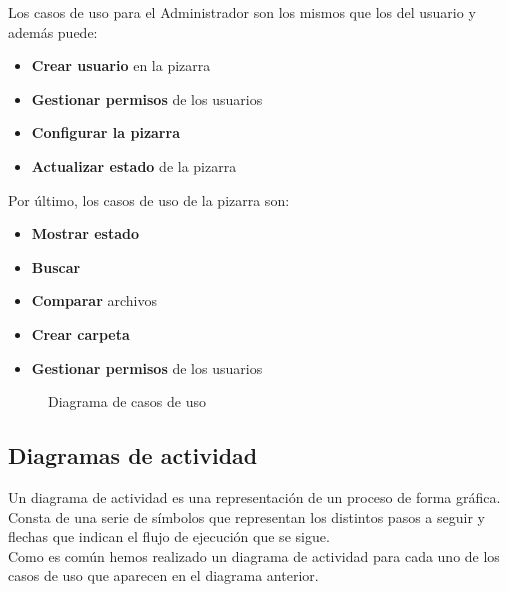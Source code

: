 Los casos de uso para el Administrador son los mismos que los del usuario y además puede:
\begin{itemize}
\item \textbf{Crear usuario} en la pizarra
\item \textbf{Gestionar permisos} de los usuarios
\item \textbf{Configurar la pizarra}
\item \textbf{Actualizar estado} de la pizarra
\end{itemize}

Por último, los casos de uso de la pizarra son:
\begin{itemize}
\item \textbf{Mostrar estado}
\item \textbf{Buscar}
\item \textbf{Comparar} archivos
\item \textbf{Crear carpeta}
\item \textbf{Gestionar permisos} de los usuarios
\end{itemize} 

\begin{landscape}
\begin{figure}[!h]
\vspace*{3cm}
\centering
\casos
\caption{Diagrama de casos de uso}
\end{figure}
\end{landscape}

\subsection{Diagramas de actividad}
Un diagrama de actividad es una representación de un proceso de forma gráfica. Consta de una serie de símbolos que representan los distintos pasos a seguir y flechas que indican el flujo de ejecución que se sigue.\\

Como es común hemos realizado un diagrama de actividad para cada uno de los casos de uso que aparecen en el diagrama anterior.

